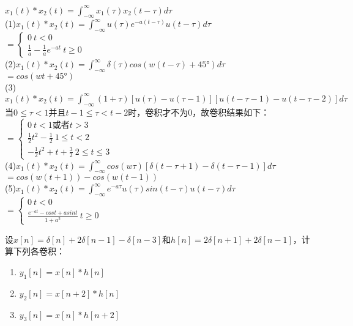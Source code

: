 \documentclass[answers]{exam}
\begin{document}
\begin{questions}
\begin{solution}
	$x_1(t)*x_2(t)=\int_{-\infty}^{\infty}x_1(\tau)x_2(t-\tau)d\tau$\\

	(1)$x_1(t)*x_2(t)=\int_{-\infty}^{\infty}u(\tau)e^{-a(t-\tau)}u(t-\tau)d\tau$\\
	$
=    \begin{cases}
        0\ t<0 \\
        \frac{1}{a}-\frac{1}{a}e^{-at}\  t\geq 0
    \end{cases}
$
\\

	(2)$x_1(t)*x_2(t)=\int_{-\infty}^{\infty}\delta(\tau)cos(w(t-\tau)+45°)d\tau$\\
	$=cos(wt+45°)$\\

	(3)$x_1(t)*x_2(t)=\int_{-\infty}^{\infty}(1+\tau)[u(\tau)-u(\tau-1)][u(t-\tau-1)-u(t-\tau-2)]d\tau$\\
	当$0\leq\tau<1$并且$t-1\leq\tau< t-2$时，卷积才不为0，故卷积结果如下：\\
	$
=    \begin{cases}
        0\ t<1\mbox{或者}t>3\\
        \frac{1}{2}t^2-\frac{1}{2}\  1\leq t<2\\
		-\frac{1}{2}t^2+t+\frac{3}{2}\ 2\leq t\leq3
    \end{cases}
$
\\

	(4)$x_1(t)*x_2(t)=\int_{-\infty}^{\infty}cos(w\tau)[\delta(t-\tau+1)-\delta(t-\tau-1)]d\tau$\\
	$=cos(w(t+1))-cos(w(t-1))$\\

	(5)$x_1(t)*x_2(t)=\int_{-\infty}^{\infty}e^{-a\tau}u(\tau)sin(t-\tau)u(t-\tau)d\tau$\\
	$
=    \begin{cases}
        0\ t<0 \\
        \frac{e^{-at}-cost+asint}{1+a^2}\  t\geq 0
    \end{cases}
$
\\	
\end{solution}



\question 设$x[n]=\delta[n]+2\delta[n-1]-\delta[n-3]$和$h[n]=2\delta[n+1]+2\delta[n-1]$，计算下列各卷积：
\begin{enumerate}[(1)]
	\item $y_1[n]=x[n]\ast h[n]$
	\item $y_2[n]=x[n+2]\ast h[n]$
	\item $y_3[n]=x[n]\ast h[n+2]$
\end{enumerate}


\end{questions}
\end{document}
